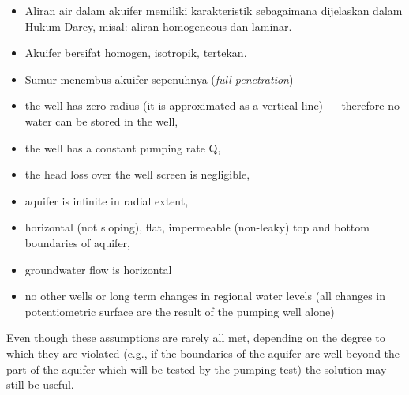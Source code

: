 \begin{itemize}
\item Aliran air dalam akuifer memiliki karakteristik sebagaimana dijelaskan dalam Hukum Darcy, misal: aliran homogeneous dan laminar. 
\item Akuifer bersifat homogen, isotropik, tertekan. 
\item Sumur menembus akuifer sepenuhnya (\textit{full penetration}) 
\item the well has zero radius (it is approximated as a vertical line) — therefore no water can be stored in the well,
\end{itemize}
\begin{itemize}
\item the well has a constant pumping rate Q,
\end{itemize}
\begin{itemize}
\item the head loss over the well screen is negligible,
\end{itemize}
\begin{itemize}
\item aquifer is infinite in radial extent,
\end{itemize}
\begin{itemize}
\item horizontal (not sloping), flat, impermeable (non-leaky) top and bottom boundaries of aquifer,
\end{itemize}
\begin{itemize}
\item groundwater flow is horizontal
\end{itemize}
\begin{itemize}
\item no other wells or long term changes in regional water levels (all changes in potentiometric surface are the result of the pumping well alone)
\end{itemize}
\begin{itemize}
\end{itemize}

Even though these assumptions are rarely all met, depending on the degree to which they are violated (e.g., if the boundaries of the aquifer are well beyond the part of the aquifer which will be tested by the pumping test) the solution may still be useful.

